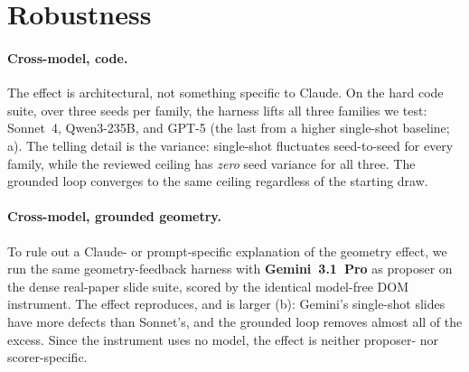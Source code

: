 \section{Robustness}
\label{sec:robustness}

\paragraph{Cross-model, code.} The effect is architectural, not something specific to Claude. On the hard code suite, over three seeds per family, the harness lifts all three families we test: Sonnet~4, Qwen3-235B, and GPT-5 (the last from a higher single-shot baseline; a). The telling detail is the variance: single-shot fluctuates seed-to-seed for every family, while the reviewed ceiling has \emph{zero} seed variance for all three. The grounded loop converges to the same ceiling regardless of the starting draw.

\paragraph{Cross-model, grounded geometry.} To rule out a Claude- or prompt-specific explanation of the geometry effect, we run the same geometry-feedback harness with \textbf{Gemini~3.1~Pro} as proposer on the dense real-paper slide suite, scored by the identical model-free DOM instrument. The effect reproduces, and is larger (b): Gemini's single-shot slides have more defects than Sonnet's, and the grounded loop removes almost all of the excess. Since the instrument uses no model, the effect is neither proposer- nor scorer-specific.

